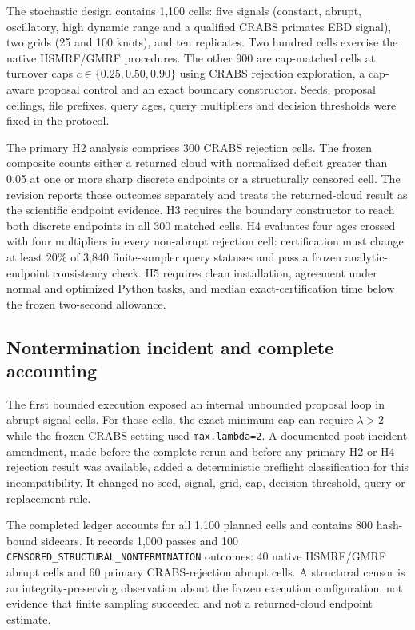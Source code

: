 \documentclass[11pt]{article}
\theoremstyle{definition}
\begin{document}
The stochastic design contains 1,100 cells: five signals (constant, abrupt, oscillatory, high dynamic range and a qualified CRABS primates EBD signal), two grids (25 and 100 knots), and ten replicates. Two hundred cells exercise the native HSMRF/GMRF procedures. The other 900 are cap-matched cells at turnover caps $c\in\{0.25,0.50,0.90\}$ using CRABS rejection exploration, a cap-aware proposal control and an exact boundary constructor. Seeds, proposal ceilings, file prefixes, query ages, query multipliers and decision thresholds were fixed in the protocol.

The primary H2 analysis comprises 300 CRABS rejection cells. The frozen composite counts either a returned cloud with normalized deficit greater than 0.05 at one or more sharp discrete endpoints or a structurally censored cell. The revision reports those outcomes separately and treats the returned-cloud result as the scientific endpoint evidence. H3 requires the boundary constructor to reach both discrete endpoints in all 300 matched cells. H4 evaluates four ages crossed with four multipliers in every non-abrupt rejection cell: certification must change at least 20\% of 3,840 finite-sampler query statuses and pass a frozen analytic-endpoint consistency check. H5 requires clean installation, agreement under normal and optimized Python tasks, and median exact-certification time below the frozen two-second allowance.

\subsection{Nontermination incident and complete accounting}
The first bounded execution exposed an internal unbounded proposal loop in abrupt-signal cells. For those cells, the exact minimum cap can require $\lambda>2$ while the frozen CRABS setting used \texttt{max.lambda=2}. A documented post-incident amendment, made before the complete rerun and before any primary H2 or H4 rejection result was available, added a deterministic preflight classification for this incompatibility. It changed no seed, signal, grid, cap, decision threshold, query or replacement rule.

The completed ledger accounts for all 1,100 planned cells and contains 800 hash-bound sidecars. It records 1,000 passes and 100 \texttt{CENSORED\_STRUCTURAL\_NONTERMINATION} outcomes: 40 native HSMRF/GMRF abrupt cells and 60 primary CRABS-rejection abrupt cells. A structural censor is an integrity-preserving observation about the frozen execution configuration, not evidence that finite sampling succeeded and not a returned-cloud endpoint estimate.
\end{document}
